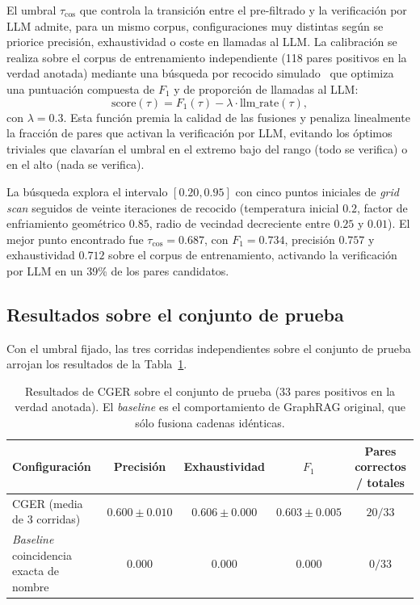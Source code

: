 El umbral $\tau_{\cos}$ que controla la transición entre el pre-filtrado y la verificación por LLM admite, para un mismo corpus, configuraciones muy distintas según se priorice precisión, exhaustividad o coste en llamadas al LLM. La calibración se realiza sobre el corpus de entrenamiento independiente (118 pares positivos en la verdad anotada) mediante una búsqueda por recocido simulado~\cite{TODO_simulated_annealing} que optimiza una puntuación compuesta de $F_1$ y de proporción de llamadas al LLM:
\begin{equation}
\text{score}(\tau) = F_1(\tau) - \lambda \cdot \text{llm\_rate}(\tau),
\end{equation}
con $\lambda = 0.3$. Esta función premia la calidad de las fusiones y penaliza linealmente la fracción de pares que activan la verificación por LLM, evitando los óptimos triviales que clavarían el umbral en el extremo bajo del rango (todo se verifica) o en el alto (nada se verifica).

La búsqueda explora el intervalo $[0.20, 0.95]$ con cinco puntos iniciales de \emph{grid scan} seguidos de veinte iteraciones de recocido (temperatura inicial $0.2$, factor de enfriamiento geométrico $0.85$, radio de vecindad decreciente entre $0.25$ y $0.01$). El mejor punto encontrado fue $\tau_{\cos} = 0.687$, con $F_1 = 0.734$, precisión $0.757$ y exhaustividad $0.712$ sobre el corpus de entrenamiento, activando la verificación por LLM en un 39\% de los pares candidatos.

\subsection{Resultados sobre el conjunto de prueba}

Con el umbral fijado, las tres corridas independientes sobre el conjunto de prueba arrojan los resultados de la Tabla~\ref{tab:eval-cger-results}.

\begin{table}[h]
\centering
\small
\begin{tabular}{lcccc}
\hline
\textbf{Configuración} & \textbf{Precisión} & \textbf{Exhaustividad} & \textbf{$F_1$} & \textbf{Pares correctos / totales} \\ \hline
CGER (media de 3 corridas) & $0.600 \pm 0.010$ & $0.606 \pm 0.000$ & $0.603 \pm 0.005$ & $20 / 33$ \\
\emph{Baseline} coincidencia exacta de nombre & $0.000$ & $0.000$ & $0.000$ & $0 / 33$ \\ \hline
\end{tabular}
\caption{Resultados de CGER sobre el conjunto de prueba (33 pares positivos en la verdad anotada). El \emph{baseline} es el comportamiento de GraphRAG original, que sólo fusiona cadenas idénticas.}
\label{tab:eval-cger-results}
\end{table}

